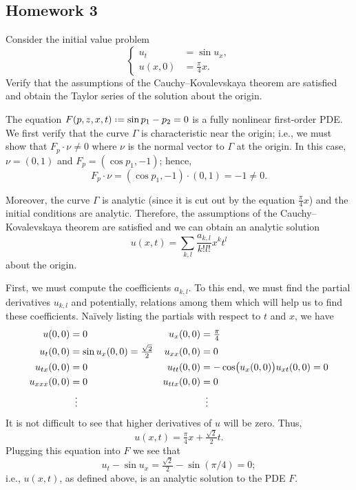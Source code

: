 \subsection{Homework 3}
\begin{problem}
  Consider the initial value problem
  \[
    \left\{
      \begin{aligned}
        u_t&=\sin u_x,\\
        u(x,0)&=\tfrac{\pi}{4}x.
      \end{aligned}
    \right.
  \]
  Verify that the assumptions of the Cauchy--Kovalevskaya theorem are
  satisfied and obtain the Taylor series of the solution about the origin.
\end{problem}
\begin{solution*}
  The equation \(F(p,z,x,t)\defeq\sin p_1-p_2=0\) is a fully nonlinear
  first-order PDE. We first verify that the curve \(\Gamma\) is
  characteristic near the origin; i.e., we must show that \(F_p\cdot\nu\neq
  0\) where \(\nu\) is the normal vector to \(\Gamma\) at the origin. In
  this case, \(\nu=(0,1)\) and \(F_p=(\cos p_1,-1)\); hence,
  \[
    F_p\cdot\nu= (\cos p_1,-1)\cdot(0,1)=-1\neq 0.
  \]

  Moreover, the curve \(\Gamma\) is analytic (since it is cut out by the
  equation \(\frac{\pi}{4}x\)) and the initial conditions are
  analytic. Therefore, the assumptions of the Cauchy--Kovalevskaya theorem
  are satisfied and we can obtain an analytic solution
  \[
    u(x,t)=\sum_{k,l}\frac{a_{k,l}}{k!l!}x^kt^l
  \]
  about the origin.

  First, we must compute the coefficients \(a_{k,l}\). To this end, we must
  find the partial derivatives \(u_{k,l}\) and potentially, relations among
  them which will help us to find these coefficients. Naïvely listing the
  partials with respect to \(t\) and \(x\), we have
  \begin{align*}
    u(0,0)&=0&
    u_x(0,0)&=\tfrac{\pi}{4}\\
    u_t(0,0)&=\sin u_x(0,0)=\tfrac{\sqrt{2}}{2}&
    u_{xx}(0,0)&=0\\
    u_{tx}(0,0)&=0&
    u_{tt}(0,0)&=-\cos\bigl(u_x(0,0)\bigr)u_{xt}(0,0)=0\\
    u_{xxx}(0,0)&=0&
    u_{ttx}(0,0)&=0\\
    &\vdotswithin{=}&&\vdotswithin{=}
  \end{align*}
  It is not difficult to see that higher derivatives of \(u\) will be
  zero. Thus,
  \[
    u(x,t)=\tfrac{\pi}{4}x+\tfrac{\sqrt{2}}{2}t.
  \]
  Plugging this equation into \(F\) we see that
  \[
    u_t-\sin u_x=\tfrac{\sqrt{2}}{2}-\sin(\pi/4)=0;
  \]
  i.e., \(u(x,t)\), as defined above, is an analytic solution to the PDE
  \(F\).
\end{solution*}

